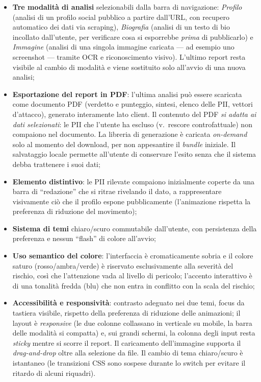 \documentclass[11pt,a4paper]{article}
\begin{document}
\begin{itemize}[nosep]
  \item \textbf{Tre modalità di analisi} selezionabili dalla barra di navigazione:
        \emph{Profilo} (analisi di un profilo social pubblico a partire dall'URL, con
        recupero automatico dei dati via scraping), \emph{Biografia} (analisi di un testo
        di bio incollato dall'utente, per verificare cosa si esporrebbe \emph{prima} di
        pubblicarlo) e \emph{Immagine} (analisi di una singola immagine caricata ---
        ad esempio uno screenshot --- tramite OCR e riconoscimento visivo). L'ultimo
        report resta visibile al cambio di modalità e viene sostituito solo all'avvio di
        una nuova analisi;
  \item \textbf{Esportazione del report in PDF}: l'ultima analisi può essere scaricata
        come documento PDF (verdetto e punteggio, sintesi, elenco delle PII, vettori
        d'attacco), generato interamente lato client. Il contenuto del PDF \emph{si adatta
        ai dati selezionati}: le PII che l'utente ha escluso (v.~rescore controfattuale)
        non compaiono nel documento. La libreria di generazione è
        caricata \emph{on-demand} solo al momento del download, per non appesantire il
        \emph{bundle} iniziale. Il salvataggio locale permette all'utente di conservare
        l'esito senza che il sistema debba trattenere i suoi dati;
  \item \textbf{Elemento distintivo}: le PII rilevate compaiono inizialmente coperte da
        una barra di ``redazione'' che si ritrae rivelando il dato, a rappresentare
        visivamente ciò che il profilo espone pubblicamente (l'animazione rispetta la
        preferenza di riduzione del movimento);
  \item \textbf{Sistema di temi} chiaro/scuro commutabile dall'utente, con
        persistenza della preferenza e nessun ``flash'' di colore all'avvio;
  \item \textbf{Uso semantico del colore}: l'interfaccia è cromaticamente sobria e il
        colore saturo (rosso/ambra/verde) è riservato esclusivamente alla severità
        del rischio, così che l'attenzione vada al livello di pericolo; l'accento
        interattivo è di una tonalità fredda (blu) che non entra in conflitto con la
        scala del rischio;
  \item \textbf{Accessibilità e responsività}: contrasto adeguato nei due temi, focus da
        tastiera visibile, rispetto della preferenza di riduzione delle animazioni; il
        layout è \emph{responsive} (le due colonne collassano in verticale su mobile, la
        barra delle modalità si compatta) e, sui grandi schermi, la colonna degli input
        resta \emph{sticky} mentre si scorre il report. Il caricamento dell'immagine
        supporta il \emph{drag-and-drop} oltre alla selezione da file. Il cambio di tema
        chiaro/scuro è istantaneo (le transizioni CSS sono sospese durante lo switch per
        evitare il ritardo di alcuni riquadri).
\end{itemize}
\end{document}
